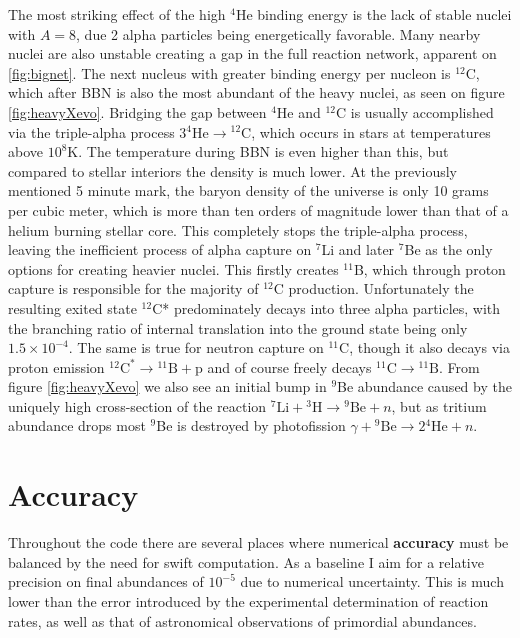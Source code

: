 The most striking effect of the high ${}^4$He binding energy is the lack of stable nuclei with $A=8$, due 2 alpha particles being energetically favorable. Many nearby nuclei are also unstable creating a gap in the full reaction network, apparent on \ref{fig:bignet}. The next nucleus with greater binding energy per nucleon is ${}^{12}$C, which after BBN is also the most abundant of the heavy nuclei, as seen on figure \ref{fig:heavyXevo}. Bridging the gap between ${}^4$He and ${}^{12}$C is usually accomplished via the triple-alpha process $3{}^4\text{He}\rightarrow {}^{12}\text{C}$, which occurs in stars at temperatures above $10^8$K. The temperature during BBN is even higher than this, but compared to stellar interiors the density is much lower. At the previously mentioned 5 minute mark, the baryon density of the universe is only 10 grams per cubic meter, which is more than ten orders of magnitude lower than that of a helium burning stellar core. This completely stops the triple-alpha process, leaving the inefficient process of alpha capture on ${}^7$Li and later ${}^7$Be as the only options for creating heavier nuclei. This firstly creates ${}^{11}$B, which through proton capture is responsible for the majority of ${}^{12}$C production. Unfortunately the resulting exited state ${}^{12}$C* predominately decays into three alpha particles, with the branching ratio of internal translation into the ground state being only $1.5\times 10^{-4}$. The same is true for neutron capture on ${}^{11}$C, though it also decays via proton emission  ${}^{12}\text{C}^\ast \rightarrow {}^{11}\text{B}+\text{p}$ and of course freely decays ${}^{11}\text{C}\rightarrow {}^{11}\text{B}$. From figure \ref{fig:heavyXevo} we also see an initial bump in ${}^9$Be abundance caused by the uniquely high cross-section of the reaction ${}^7\text{Li}+{}^3\text{H}\rightarrow {}^9\text{Be}+n$, but as tritium abundance drops most ${}^9$Be is destroyed by photofission $\gamma+{}^9\text{Be}\rightarrow 2{}^4\text{He}+n$.


\section{Accuracy}
\label{sec:Accuracy}
Throughout the code there are several places where numerical \textbf{accuracy} must be balanced by the need for swift computation. As a baseline I aim for a relative precision on final abundances of $10^{-5}$ due to numerical uncertainty. This is much lower than the error introduced by the experimental determination of reaction rates, as well as that of astronomical observations of primordial abundances. 


